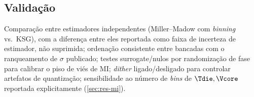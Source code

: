 \subsection{Validação}
Comparação entre estimadores independentes (Miller--Madow com
\emph{binning} vs.\ KSG), com a diferença entre eles reportada como faixa de
incerteza de estimador, não suprimida; ordenação consistente entre bancadas
com o ranqueamento de $\sigma$ publicado; testes surrogate/nulos por
randomização de fase para calibrar o piso de viés de MI; \emph{dither}
ligado/desligado para controlar artefatos de quantização; sensibilidade ao
número de \emph{bins} de $\Tdie,\Vcore$ reportada explicitamente
(\cref{sec:res-mi}).

